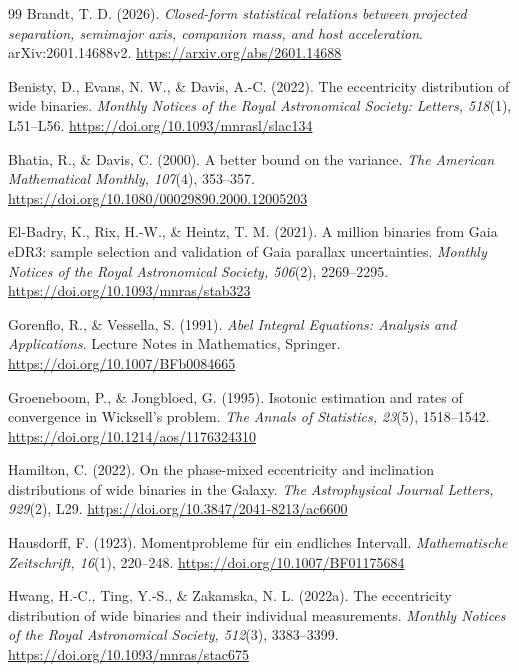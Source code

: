 \documentclass[11pt,a4paper]{article}
\theoremstyle{remark}\newtheorem{remark}[theorem]{Remark}
\begin{document}
\begin{thebibliography}{99}
Brandt, T. D. (2026). \emph{Closed-form statistical relations between projected separation, semimajor axis, companion mass, and host acceleration}. arXiv:2601.14688v2. \url{https://arxiv.org/abs/2601.14688}

Benisty, D., Evans, N. W., \& Davis, A.-C. (2022). The eccentricity distribution of wide binaries. \emph{Monthly Notices of the Royal Astronomical Society: Letters, 518}(1), L51--L56. \url{https://doi.org/10.1093/mnrasl/slac134}

Bhatia, R., \& Davis, C. (2000). A better bound on the variance. \emph{The American Mathematical Monthly, 107}(4), 353--357. \url{https://doi.org/10.1080/00029890.2000.12005203}

El-Badry, K., Rix, H.-W., \& Heintz, T. M. (2021). A million binaries from Gaia eDR3: sample selection and validation of Gaia parallax uncertainties. \emph{Monthly Notices of the Royal Astronomical Society, 506}(2), 2269--2295. \url{https://doi.org/10.1093/mnras/stab323}

Gorenflo, R., \& Vessella, S. (1991). \emph{Abel Integral Equations: Analysis and Applications}. Lecture Notes in Mathematics, Springer. \url{https://doi.org/10.1007/BFb0084665}

Groeneboom, P., \& Jongbloed, G. (1995). Isotonic estimation and rates of convergence in Wicksell's problem. \emph{The Annals of Statistics, 23}(5), 1518--1542. \url{https://doi.org/10.1214/aos/1176324310}

Hamilton, C. (2022). On the phase-mixed eccentricity and inclination distributions of wide binaries in the Galaxy. \emph{The Astrophysical Journal Letters, 929}(2), L29. \url{https://doi.org/10.3847/2041-8213/ac6600}

Hausdorff, F. (1923). Momentprobleme f\"ur ein endliches Intervall. \emph{Mathematische Zeitschrift, 16}(1), 220--248. \url{https://doi.org/10.1007/BF01175684}

Hwang, H.-C., Ting, Y.-S., \& Zakamska, N. L. (2022a). The eccentricity distribution of wide binaries and their individual measurements. \emph{Monthly Notices of the Royal Astronomical Society, 512}(3), 3383--3399. \url{https://doi.org/10.1093/mnras/stac675}


\end{thebibliography}
\end{document}
